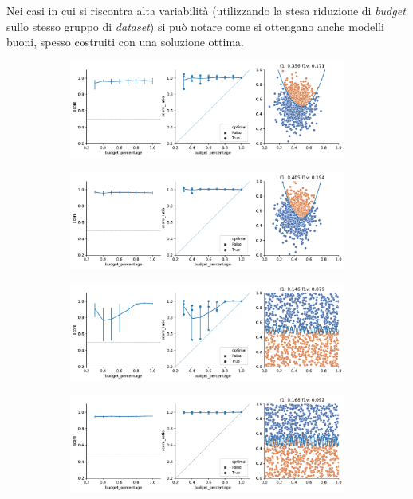 Nei casi in cui si riscontra alta variabilità (utilizzando la stesa riduzione di \emph{budget} sullo stesso gruppo di \emph{dataset}) si può notare come si ottengano anche modelli buoni, spesso costruiti con una soluzione ottima.
\begin{figure}
    \begin{subfigure}{.5\textwidth}
        \centering
        \includegraphics[width=\textwidth]{img/2d/3.pdf}
    \end{subfigure}%
    \begin{subfigure}{.5\textwidth}
        \centering
        \includegraphics[width=\textwidth]{img/2d/4.pdf}
    \end{subfigure}%
    \hfill
    \begin{subfigure}{.5\textwidth}
        \centering
        \includegraphics[width=\textwidth]{img/2d/8.pdf}
    \end{subfigure}%
    \begin{subfigure}{.5\textwidth}
        \centering
        \includegraphics[width=\textwidth]{img/2d/9.pdf}

\end{subfigure}
\end{figure}
